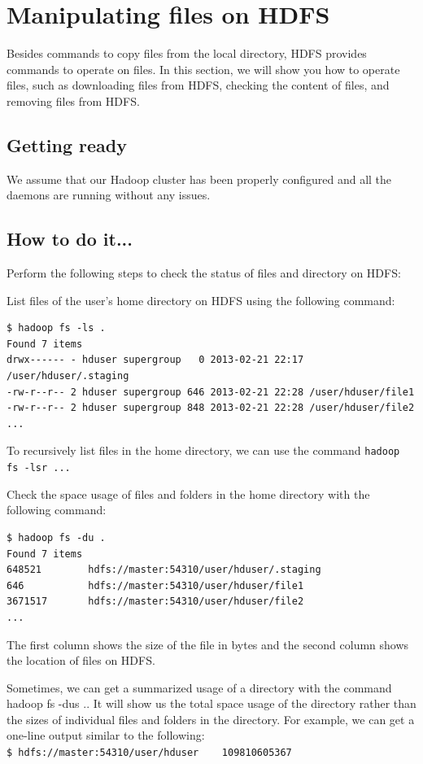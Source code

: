 \section{Manipulating files on HDFS}
Besides commands to copy files from the local directory, HDFS provides commands to operate on files. In this section, we will show you how to operate files, such as downloading files from HDFS, checking the content of files, and removing files from HDFS.
\subsection*{Getting ready}
We assume that our Hadoop cluster has been properly configured and all the daemons are running without any issues.
\subsection*{How to do it...}
Perform the following steps to check the status of files and directory on HDFS:

List files of the user's home directory on HDFS using the following command:
\begin{verbatim}
$ hadoop fs -ls .
Found 7 items
drwx------ - hduser supergroup   0 2013-02-21 22:17 /user/hduser/.staging
-rw-r--r-- 2 hduser supergroup 646 2013-02-21 22:28 /user/hduser/file1
-rw-r--r-- 2 hduser supergroup 848 2013-02-21 22:28 /user/hduser/file2
...
\end{verbatim}

To recursively list files in the home directory, we can use the command \verb|hadoop fs -lsr ...|

Check the space usage of files and folders in the home directory with the following command:
\begin{verbatim}
$ hadoop fs -du .
Found 7 items
648521        hdfs://master:54310/user/hduser/.staging
646           hdfs://master:54310/user/hduser/file1
3671517       hdfs://master:54310/user/hduser/file2
...
\end{verbatim}

The first column shows the size of the file in bytes and the second column shows the location of files on HDFS.

Sometimes, we can get a summarized usage of a directory with the command hadoop fs -dus .. It will show us the total space usage of the directory rather than the sizes of individual files and folders in the directory. For example, we can get a one-line output similar to the following: \\
\verb|$ hdfs://master:54310/user/hduser    109810605367|

